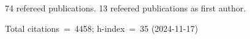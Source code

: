 74 refereed publications. 13 refeered publications as first author.

Total citations~=~4458; h-index~=~35 (2024-11-17)
